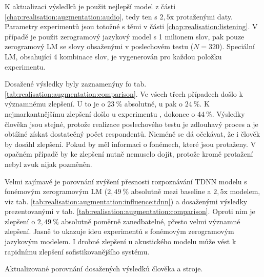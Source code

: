 K aktualizaci výsledků je použit nejlepší model z části \ref{chap:realisation:augmentation:audio}, tedy ten s $2,5\mathrm{x}$ protaženými daty.
Parametry experimentů jsou totožné s těmi v části \ref{chap:realisation:listening}.
V případě  je použit zerogramový jazykový model s 1 milionem slov,  pak pouze zerogramový LM se slovy obsaženými v poslechovém testu ($N = 320$).
Speciální LM, obsahující 4 kombinace slov, je vygenerován pro každou položku  experimentu.

Dosažené výsledky byly zaznamenýny fo tab. \ref{tab:realisation:augmentation:comparison}.
Ve všech třech případech došlo k významnému zlepšení.
U  to je o $23\ \%$ absolutně, u  pak o $24\ \%$.
K nejmarkantnějšímu zlepšení došlo u experimentu , dokonce o $44\ \%$.
Výsledky člověka jsou stejné, protože realizace poslechového testu je zdlouhavý proces a je obtížné získat dostatečný počet respondentů.
Nicméně se dá očekávat, že i člověk by dosáhl zlepšení.
Pokud by měl informaci o fonémech, které jsou protaženy.
V opačném případě by ke zlepšení nutně nemuselo dojít, protože kromě protažení nebyl zvuk nijak pozměněn.

Velmi zajímavé je porovnání zvýšení přesnosti rozpoznávání TDNN modelu s fonémovým zerogramovým LM ($2,49\ \%$ absolutně mezi baseline a $2,5\mathrm{x}$ modelem, viz tab. \ref{tab:realisation:augmentation:influence:tdnn}) a dosaženými výsledky prezentovanými v tab. \ref{tab:realisation:augmentation:comparison}.
Oproti nim je zlepšení o $2,49\ \%$ absolutně poměrně zanedbatelné, přesto velmi významné zlepšení.
Jasně to ukazuje ideu experimentů s fonémovým zerogramovým jazykovým modelem.
I drobné zlepšení u akustického modelu může vést k rapidnímu zlepšení sofistikovanějšího systému.

\begin{table}[htpb]
  \centering
  \def\arraystretch{1.5}
  \caption{Aktualizované porovnání dosažených výsledků člověka a stroje.}
  \label{tab:realisation:augmentation:comparison}
\end{table}

